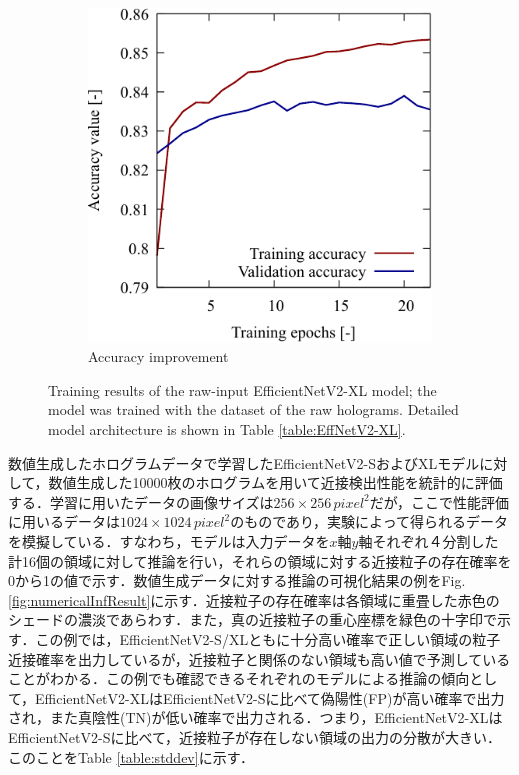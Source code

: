 \begin{figure}[H]
\begin{subfigure}[t]{0.45\linewidth}
        \includegraphics[width=\linewidth]{./Figure/4_Results/training/accXL.pdf}
        \caption{Accuracy improvement}
        \label{fig:rawmodelXL:acc}
    \end{subfigure}

    \caption{Training results of the raw-input EfficientNetV2-XL model; the model was trained with the dataset of the raw holograms. Detailed model architecture is shown in Table \ref{table:EffNetV2-XL}.} 
    \label{fig:rawmodelXL}
\end{figure}


数値生成したホログラムデータで学習したEfficientNetV2-SおよびXLモデルに対して，数値生成した10000枚のホログラムを用いて近接検出性能を統計的に評価する．学習に用いたデータの画像サイズは$256\times 256 \,\si{pixel^2}$だが，ここで性能評価に用いるデータは$1024 \times 1024 \,\si{pixel^2}$のものであり，実験によって得られるデータを模擬している．すなわち，モデルは入力データを$x$軸$y$軸それぞれ４分割した計16個の領域に対して推論を行い，それらの領域に対する近接粒子の存在確率を0から1の値で示す．数値生成データに対する推論の可視化結果の例をFig. \ref{fig:numericalInfResult}に示す．近接粒子の存在確率は各領域に重畳した赤色のシェードの濃淡であらわす．また，真の近接粒子の重心座標を緑色の十字印で示す．この例では，EfficientNetV2-S/XLともに十分高い確率で正しい領域の粒子近接確率を出力しているが，近接粒子と関係のない領域も高い値で予測していることがわかる．この例でも確認できるそれぞれのモデルによる推論の傾向として，EfficientNetV2-XLはEfficientNetV2-Sに比べて偽陽性(FP)が高い確率で出力され，また真陰性(TN)が低い確率で出力される．つまり，EfficientNetV2-XLはEfficientNetV2-Sに比べて，近接粒子が存在しない領域の出力の分散が大きい．このことをTable \ref{table:stddev}に示す．

